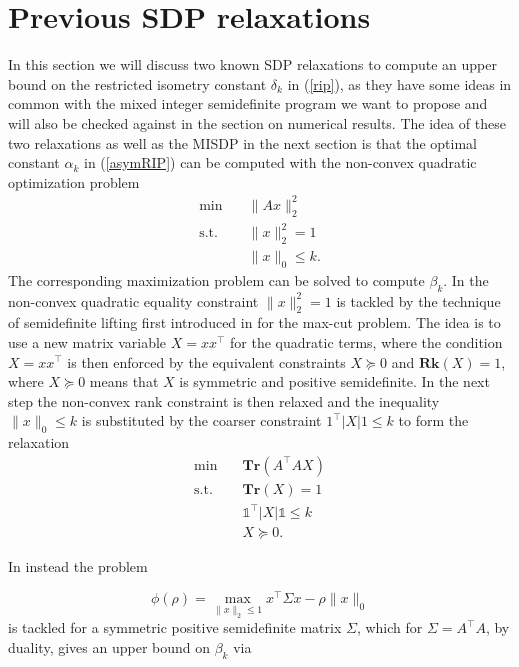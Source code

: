 \documentclass[a4paper,11pt,1p]{elsarticle}
\newcommand{\T}{^{\top}}
\newcommand{\ones}{\mathds{1}}
\begin{document}
\section{Previous SDP relaxations}

In this section we will discuss two known SDP relaxations to compute an upper bound on the restricted isometry constant $\delta_k$ in (\ref{rip}), as they have some ideas in common with the mixed integer semidefinite program we want to 
propose and will also be checked against in the section on numerical results. The idea of these two relaxations as well as the MISDP in the next section is that the optimal constant $\alpha_k$ in (\ref{asymRIP}) can be computed
with the non-convex quadratic optimization problem
\begin{align}\label{QP}
 \text{min} \quad & \|Ax\|_2^2 \nonumber \\
 \text{s.t.} \quad & \|x\|_2^2 = 1 \tag{QP} \\
 & \|x\|_0 \leq k. \nonumber
\end{align}
The corresponding maximization problem can be solved to compute $\beta_k$. In \cite{Asp07} the non-convex quadratic equality constraint $\|x\|_2^2 = 1$ is tackled by the technique of semidefinite lifting first introduced in \cite{GW95} 
for the max-cut problem. The idea is to use a new matrix variable $X=xx\T$ for the quadratic terms, where the condition $X=xx\T$ is then enforced by the equivalent constraints $X \succeq 0$ and $\textbf{Rk}(X) = 1$, where 
$X \succeq 0$ means that $X$ is symmetric and positive semidefinite. In the next step the non-convex rank constraint is then relaxed and the inequality $\|x\|_0 \leq k$ is substituted by the coarser constraint $1\T|X|1 \leq k$ to form
the relaxation
\begin{align}\label{Asp07}
 \text{min} \quad & \textbf{Tr}(A\T A X) \nonumber \\
 \text{s.t.} \quad & \textbf{Tr}(X) = 1 \nonumber \\
 & \ones\T|X|\ones \leq k \tag{Asp07} \\
 & X \succeq 0. \nonumber
\end{align}

In \cite{Asp08} instead the problem

\begin{equation}\label{phi}
 \phi(\rho) = \max_{\|x\|_2 \leq 1} x\T \Sigma x - \rho \|x\|_0
\end{equation}
is tackled for a symmetric positive semidefinite matrix $\Sigma$, which for
$\Sigma = A\T A$, by duality, gives an upper bound on $\beta_k$ via 
\end{document}
